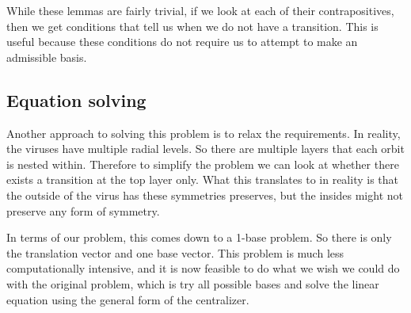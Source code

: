 \documentclass[a4paper,10pt]{article}
\theoremstyle{plain}
\theoremstyle{definition}
\theoremstyle{remark}
\begin{document}

While these lemmas are fairly trivial, if we look at each of their contrapositives, then we get conditions that tell us when we do not have a transition.
This is useful because these conditions do not require us to attempt to make an admissible basis.

\subsection{Equation solving}
Another approach to solving this problem is to relax the requirements.
In reality, the viruses have multiple radial levels.
So there are multiple layers that each orbit is nested within.
Therefore to simplify the problem we can look at whether there exists a transition at the top layer only.
What this translates to in reality is that the outside of the virus has these symmetries preserves, but the insides might not preserve any form of symmetry.

In terms of our problem, this comes down to a 1-base problem.
So there is only the translation vector and one base vector.
This problem is much less computationally intensive, and it is now feasible to do what we wish we could do with the original problem, which is try all possible bases and solve the linear equation using the general form of the centralizer.
\end{document}
